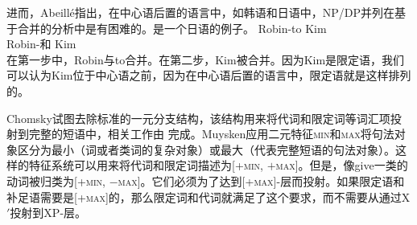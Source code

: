 进而，Abeillé指出，在中心语后置的语言中，如韩语和日语中，NP/DP并列在基于合并的分析中是有困难的。是一个日语的例子。
\ea
\label{coordination-head-final}
\gll Robin-to Kim\\
     Robin-和 Kim\\
\z
在第一步中，Robin与to合并。在第二步，Kim被合并。因为Kim是限定语，我们可以认为Kim位于中心语之前，因为在中心语后置的语言中，限定语就是这样排列的。

Chomsky试图去除标准\xbartc 的一元分支结构，该结构用来将代词和限定词等词汇项投射到完整的短语中，相关工作由 \citet{Muysken82a}完成。Muysken应用二元特征\textsc{min}和\textsc{max}将句法对象区分为最小（词或者类词的复杂对象）或最大（代表完整短语的句法对象）。这样的特征系统可以用来将代词和限定词描述为[+\textsc{min}, $+$\textsc{max}]。但是，像give一类的动词被归类为[+\textsc{min},  $-$\textsc{max}]。它们必须为了达到[+\textsc{max}]-层而投射。如果限定语和补足语需要是[+\textsc{max}]的，那么限定词和代词就满足了这个要求，而不需要从\xzeroc 通过X$'$投射到XP-层。

